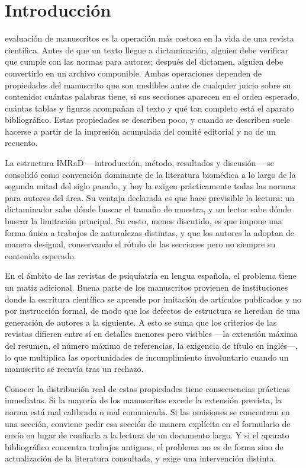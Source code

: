 \documentclass{apm-editorial}
\begin{document}
\makeAPMeditorial


\section*{Introducción}

 evaluación de manuscritos es la operación más costosa en
la vida de una revista científica. Antes de que un texto llegue a
dictaminación, alguien debe verificar que cumple con las normas para
autores; después del dictamen, alguien debe convertirlo en un archivo
componible. Ambas operaciones dependen de propiedades del manuscrito
que son medibles antes de cualquier juicio sobre su contenido: cuántas
palabras tiene, si sus secciones aparecen en el orden esperado, cuántas
tablas y figuras acompañan al texto y qué tan completo está el aparato
bibliográfico. Estas propiedades se describen poco, y cuando se
describen suele hacerse a partir de la impresión acumulada del comité
editorial y no de un recuento.

La estructura IMRaD —introducción, método, resultados y discusión— se
consolidó como convención dominante de la literatura biomédica a lo
largo de la segunda mitad del siglo pasado, y hoy la exigen
prácticamente todas las normas para autores del área. Su ventaja
declarada es que hace previsible la lectura: un dictaminador sabe dónde
buscar el tamaño de muestra, y un lector sabe dónde buscar la
limitación principal. Su costo, menos discutido, es que impone una
forma única a trabajos de naturalezas distintas, y que los autores la
adoptan de manera desigual, conservando el rótulo de las secciones pero
no siempre su contenido esperado.

En el ámbito de las revistas de psiquiatría en lengua española, el
problema tiene un matiz adicional. Buena parte de los manuscritos
provienen de instituciones donde la escritura científica se aprende por
imitación de artículos publicados y no por instrucción formal, de modo
que los defectos de estructura se heredan de una generación de autores
a la siguiente. A esto se suma que los criterios de las revistas
difieren entre sí en detalles menores pero visibles —la extensión
máxima del resumen, el número máximo de referencias, la exigencia de
título en inglés—, lo que multiplica las oportunidades de
incumplimiento involuntario cuando un manuscrito se reenvía tras un
rechazo.

Conocer la distribución real de estas propiedades tiene consecuencias
prácticas inmediatas. Si la mayoría de los manuscritos excede la
extensión prevista, la norma está mal calibrada o mal comunicada. Si
las omisiones se concentran en una sección, conviene pedir esa sección
de manera explícita en el formulario de envío en lugar de confiarla a
la lectura de un documento largo. Y si el aparato bibliográfico
concentra trabajos antiguos, el problema no es de forma sino de
actualización de la literatura consultada, y exige una intervención
distinta.
\end{document}
